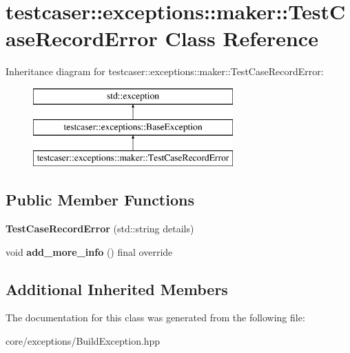 \hypertarget{classtestcaser_1_1exceptions_1_1maker_1_1TestCaseRecordError}{}\section{testcaser\+:\+:exceptions\+:\+:maker\+:\+:Test\+Case\+Record\+Error Class Reference}
\label{classtestcaser_1_1exceptions_1_1maker_1_1TestCaseRecordError}
Inheritance diagram for testcaser\+:\+:exceptions\+:\+:maker\+:\+:Test\+Case\+Record\+Error\+:\begin{figure}[H]
\begin{center}
\leavevmode
\includegraphics[height=3.000000cm]{classtestcaser_1_1exceptions_1_1maker_1_1TestCaseRecordError}
\end{center}
\end{figure}
\subsection*{Public Member Functions}
\begin{DoxyCompactItemize}
\item 
\mbox{\label{classtestcaser_1_1exceptions_1_1maker_1_1TestCaseRecordError_a637b3f04aa9980c598cf639a7628ce77}} 
{\bfseries Test\+Case\+Record\+Error} (std\+::string details)
\item 
\mbox{\label{classtestcaser_1_1exceptions_1_1maker_1_1TestCaseRecordError_afe4b429c87986340aea7217dd86674da}} 
void {\bfseries add\+\_\+more\+\_\+info} () final override
\end{DoxyCompactItemize}
\subsection*{Additional Inherited Members}


The documentation for this class was generated from the following file\+:\begin{DoxyCompactItemize}
\item 
core/exceptions/Build\+Exception.\+hpp\end{DoxyCompactItemize}
